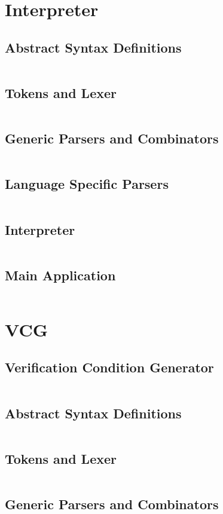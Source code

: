 \documentclass[a4paper,9pt,twoside]{book}
\newcommand{\hsfile}[1]{\inputminted[breaklines]{haskell}{../haskell/#1.hs}}
\begin{document}
\chapter{Interpreter}
\section{Abstract Syntax Definitions}
\hsfile{interpreter/AbsSyn}
\section{Tokens and Lexer}
\hsfile{interpreter/Scanner}
\section{Generic Parsers and Combinators}
\hsfile{interpreter/ParserCombis2}
\section{Language Specific Parsers}
\hsfile{interpreter/Parser2}
\section{Interpreter}
\hsfile{interpreter/Interpreter}
\section{Main Application}
\hsfile{interpreter/Main}

\chapter{VCG}
\section{Verification Condition Generator}
\hsfile{vcg/VCG}
\section{Abstract Syntax Definitions}
\hsfile{vcg/AbsSyn}
\section{Tokens and Lexer}
\hsfile{vcg/Scanner}
\section{Generic Parsers and Combinators}
\hsfile{vcg/ParserCombis}
\end{document}
